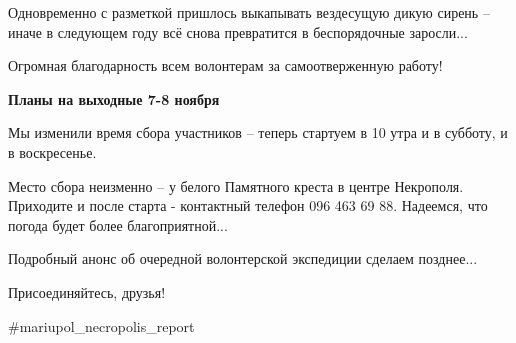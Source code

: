 Одновременно с разметкой пришлось выкапывать вездесущую дикую сирень – иначе в
следующем году всё снова превратится в беспорядочные заросли...

Огромная благодарность всем волонтерам за самоотверженную работу!

\textbf{Планы на выходные 7-8 ноября}

Мы изменили время сбора участников – теперь стартуем в 10 утра и в субботу, и в
воскресенье.

Место сбора неизменно – у белого Памятного креста в центре Некрополя. Приходите
и после старта - контактный телефон 096 463 69 88. Надеемся, что погода будет
более благоприятной...

Подробный анонс об очередной волонтерской экспедиции сделаем позднее...

Присоединяйтесь, друзья!

\#mariupol\_necropolis\_report
